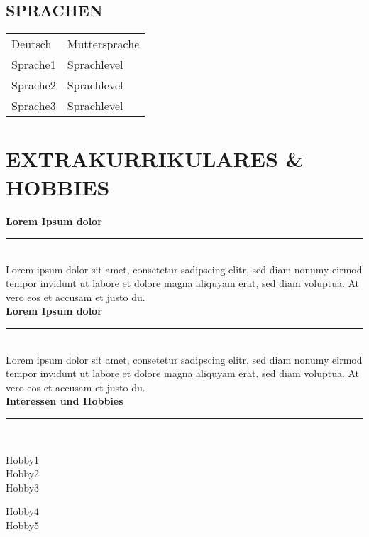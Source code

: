 \documentclass{article}
\newcommand{\seperator}{\vspace{2em}{\color{grayray}\centerline{\rule{\linewidth}{.5pt}}}\vspace{.5em}}
\begin{document}
    \vspace{.3cm}

    \subsection*{\MakeUppercase{Sprachen}}
    \begin{tabular}{@{}ll}
        Deutsch     & Muttersprache\\ 
        Sprache1   & Sprachlevel\\ 
        Sprache2   & Sprachlevel\\ 
        Sprache3   & Sprachlevel\\ 
    \end{tabular}

    \seperator

    \section*{\MakeUppercase{Extrakurrikulares \& Hobbies}}
    
    \textbf{Lorem Ipsum dolor}\vspace{-1em}\\
    \noindent\rule{.05\textwidth}{1pt}\\
    Lorem ipsum dolor sit amet, consetetur sadipscing elitr, sed diam nonumy eirmod tempor invidunt ut labore et dolore magna aliquyam erat, sed diam voluptua. At vero eos et accusam et justo du.\\

    \textbf{Lorem Ipsum dolor}\vspace{-1em}\\
    \noindent\rule{.05\textwidth}{1pt}\\
    Lorem ipsum dolor sit amet, consetetur sadipscing elitr, sed diam nonumy eirmod tempor invidunt ut labore et dolore magna aliquyam erat, sed diam voluptua. At vero eos et accusam et justo du.\\

    \textbf{Interessen und Hobbies}\vspace{-1em}\\
    \noindent\rule{.05\textwidth}{1pt}\\
    \begin{minipage}[t]{.33\textwidth}
        Hobby1\\
        Hobby2\\
        Hobby3\\
    \end{minipage}%
    \begin{minipage}[t]{.33\textwidth}
        Hobby4\\
        Hobby5\\
    \end{minipage}
\end{document}

